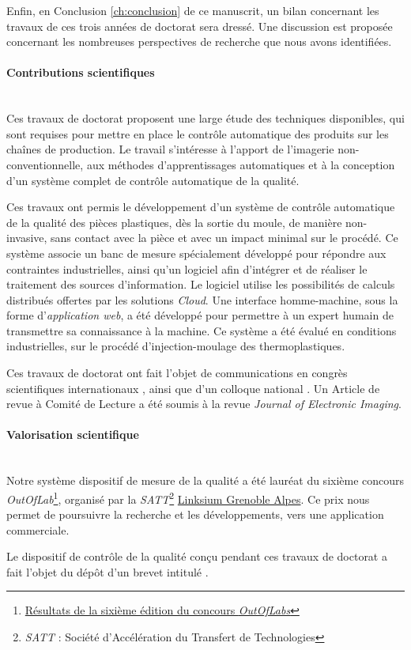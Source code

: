 Enfin, en Conclusion \ref{ch:conclusion} de ce manuscrit, un bilan concernant les travaux de ces trois années de doctorat sera dressé.
Une discussion est proposée concernant les nombreuses perspectives de recherche que nous avons identifiées.

\bigskip
\paragraph{Contributions scientifiques}\mbox{} \\

Ces travaux de doctorat proposent une large étude des techniques disponibles, qui sont requises pour mettre en place le contrôle automatique des produits sur les chaînes de production.
Le travail s'intéresse à l'apport de l'imagerie non-conventionnelle, aux méthodes d'apprentissages automatiques et à la conception d'un système complet de contrôle automatique de la qualité.

Ces travaux ont permis le développement d'un système de contrôle automatique de la qualité des pièces plastiques, dès la sortie du moule, de manière non-invasive, sans contact avec la pièce et avec un impact minimal sur le procédé.
Ce système associe un banc de mesure spécialement développé pour répondre aux contraintes industrielles, ainsi qu'un logiciel afin d'intégrer et de réaliser le traitement des sources d'information.
Le logiciel utilise les possibilités de calculs distribués offertes par les solutions \textit{Cloud}.
Une interface homme-machine, sous la forme d'\textit{application web}, a été développé pour permettre à un expert humain de transmettre sa connaissance à la machine.
Ce système a été évalué en conditions industrielles, sur le procédé d'injection-moulage des thermoplastiques.

\bigskip
Ces travaux de doctorat ont fait l’objet de communications en congrès scientifiques internationaux \cite{nagorny_towards_2017, nagorny_injection_2017, nagorny_quality_2017, nagorny_generative_2018, nagorny_polarimetric_2019}, ainsi que d'un colloque national \cite{nagorny_towards_2017}.
Un Article de revue à Comité de Lecture a été soumis à la revue \textit{Journal of Electronic Imaging}.

\bigskip
\paragraph{Valorisation scientifique}\mbox{} \\

Notre système dispositif de mesure de la qualité a été lauréat du sixième concours \textit{OutOfLab}\footnote{\href{http://outoflabs.linksium.fr/resultats/}{Résultats de la sixième édition du concours \textit{OutOfLabs}}}, organisé par la \textit{SATT}\footnote{\textit{SATT} : Société d'Accélération du Transfert de Technologies} \href{https://www.linksium.fr/}{Linksium Grenoble Alpes}.
Ce prix nous permet de poursuivre la recherche et les développements, vers une application commerciale.

Le dispositif de contrôle de la qualité conçu pendant ces travaux de doctorat a fait l'objet du dépôt d'un brevet intitulé  \cite{nagorny_dispositif_2019}.
